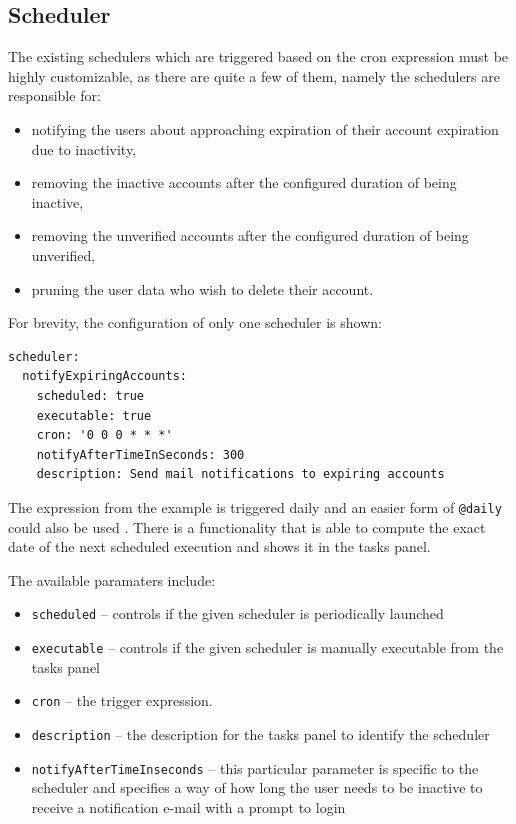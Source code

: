 \documentclass[a4paper,twoside,12pt]{book}
\begin{document}
\subsection{Scheduler}

The existing schedulers which are triggered based on the cron expression must be highly customizable, as there are quite a few of them, namely the schedulers are responsible for:
\begin{itemize}
\item notifying the users about approaching expiration of their account expiration due to inactivity,
\item removing the inactive accounts after the configured duration of being inactive,
\item removing the unverified accounts after the configured duration of being unverified,
\item pruning the user data who wish to delete their account.
\end{itemize}

For brevity, the configuration of only one scheduler is shown:
\begin{verbatim}
scheduler:
  notifyExpiringAccounts:
    scheduled: true
    executable: true
    cron: '0 0 0 * * *'
    notifyAfterTimeInSeconds: 300
    description: Send mail notifications to expiring accounts
\end{verbatim}

The expression from the example is triggered daily and an easier form of \verb|@daily| could also be used \cite{bib:spring_cron}. There is a functionality that is able to compute the exact date of the next scheduled execution and shows it in the tasks panel.

The available paramaters include:
\begin{itemize}
\item \verb|scheduled| -- controls if the given scheduler is periodically launched
\item \verb|executable| -- controls if the given scheduler is manually executable from the tasks panel
\item \verb|cron| -- the trigger expression. 
\item \verb|description| -- the description for the tasks panel to identify the scheduler
\item \verb|notifyAfterTimeInseconds| -- this particular parameter is specific to the scheduler and specifies a way of how long the user needs to be inactive to receive a notification e-mail with a prompt to login
\end{itemize}
\end{document}

